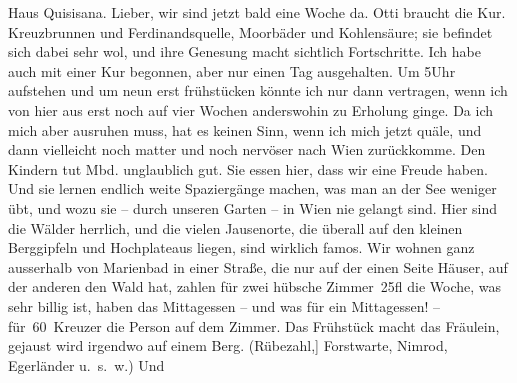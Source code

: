 \pstart
           \raggedleft{}Haus Quisisana.\pend
           \vspace{0.5em}
\pstart
           Lieber, wir sind jetzt bald eine Woche da. Otti braucht die Kur. Kreuzbrunnen und Ferdinandsquelle,
               Moorbäder und Kohlensäure; sie befindet sich dabei sehr wol, und ihre Genesung macht
               sichtlich Fortschritte. Ich habe auch mit einer Kur begonnen, aber nur einen Tag
               ausgehalten. Um 5Uhr aufstehen und um neun erst frühstücken
               könnte ich nur dann vertragen, wenn ich von hier aus erst noch auf vier Wochen
               anderswohin zu Erholung ginge. Da ich mich aber ausruhen muss, hat es keinen Sinn,
               wenn ich mich jetzt quäle, und dann vielleicht noch matter und noch nervöser nach Wien zurückkomme. Den Kindern tut Mbd. unglaublich gut. Sie essen hier, dass wir eine Freude
               haben. Und sie lernen endlich weite Spaziergänge machen, was man an der See weniger
               übt, und wozu sie – durch unseren Garten – in Wien
               nie gelangt sind. Hier sind die Wälder herrlich, und die vielen Jausenorte, die
               überall auf den kleinen Berggipfeln und Hochplateaus liegen, sind wirklich famos. Wir
               wohnen ganz ausserhalb von Marienbad in einer
               Straße, die nur auf der einen Seite Häuser, auf der anderen den Wald hat, zahlen für
               zwei hübsche Zimmer 25fl die Woche, was sehr billig ist, haben das Mittagessen – und
               was für ein Mittagessen! – für 60 Kreuzer die Person auf dem Zimmer. Das Frühstück
               macht das 
               Fräulein, gejaust wird
               irgendwo auf einem Berg. (Rübezahl\oindex{Hotel Rübezahl@\textbf{Hotel Rübezahl}|pw}{[},{]}{ }Forstwarte, Nimrod, Egerländer u. s. w.) Und

